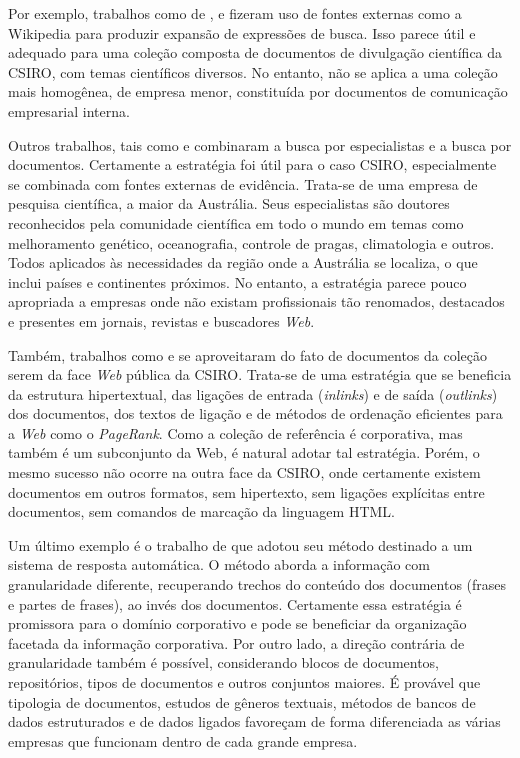 Por exemplo, trabalhos como de ,  e  fizeram uso de fontes externas como a Wikipedia para produzir expansão de expressões de busca. Isso parece útil e adequado para uma coleção composta de documentos de divulgação científica da CSIRO, com temas científicos diversos. No entanto, não se aplica a uma coleção mais homogênea, de empresa menor, constituída por documentos de comunicação empresarial interna. 

Outros trabalhos, tais como  e  combinaram a busca por especialistas e a busca por documentos. Certamente a estratégia foi útil para o caso CSIRO, especialmente se combinada com fontes externas de evidência. Trata-se de uma empresa de pesquisa científica, a maior da Austrália. Seus especialistas são doutores reconhecidos pela comunidade científica em todo o mundo em temas como melhoramento genético, oceanografia, controle de pragas, climatologia e outros. Todos aplicados às necessidades da região onde a Austrália se localiza, o que inclui países e continentes próximos. No entanto, a estratégia parece pouco apropriada a empresas onde não existam profissionais tão renomados, destacados e presentes em jornais, revistas e buscadores \textit{Web}.

Também, trabalhos como  e  se aproveitaram do fato de documentos da coleção serem da face \textit{Web} pública da CSIRO. Trata-se de uma estratégia que se beneficia da estrutura hipertextual, das ligações de entrada (\textit{inlinks}) e de saída (\textit{outlinks}) dos documentos, dos textos de ligação e de métodos de ordenação eficientes para a \textit{Web} como o \textit{PageRank}. Como a coleção de referência é corporativa, mas também é um subconjunto da Web, é natural adotar tal estratégia. Porém, o mesmo sucesso não ocorre na outra face da CSIRO, onde certamente existem documentos em outros formatos, sem hipertexto, sem ligações explícitas entre documentos, sem comandos de marcação da linguagem HTML.

Um último exemplo é o trabalho de  que adotou seu método destinado a um sistema de resposta automática. O método aborda a informação com granularidade diferente, recuperando trechos do conteúdo dos documentos (frases e partes de frases), ao invés dos documentos. Certamente essa estratégia é promissora para o domínio corporativo e pode se beneficiar da organização facetada da informação corporativa. Por outro lado, a direção contrária de granularidade também é possível, considerando blocos de documentos, repositórios, tipos de documentos e outros conjuntos maiores. É provável que tipologia de documentos, estudos de gêneros textuais, métodos de bancos de dados estruturados e de dados ligados favoreçam de forma diferenciada as várias empresas que funcionam dentro de cada grande empresa.

